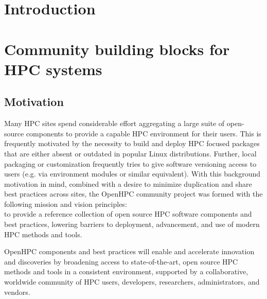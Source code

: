 \documentclass{sig-alternate-05-2015}
\begin{document}
%
%

%
%
\printccsdesc


\section{Introduction}


\section{Community building blocks for HPC systems}

\subsection{Motivation}
Many HPC sites spend considerable effort aggregating a large suite of
open-source components to provide a capable HPC environment for their users.
This is frequently motivated by the necessity to build and deploy HPC focused
packages that are either absent or outdated in popular Linux
distributions. Further, local packaging or customization frequently tries to
give software versioning access to users (e.g. via environment modules or
similar equivalent).  With this background motivation in mind, combined with a
desire to minimize duplication and share best practices across sites, the OpenHPC community
project was formed with the following mission and vision principles: \\

 to 
provide a reference collection of open source HPC software components and
best practices, lowering barriers to deployment, advancement, and use of
modern HPC methods and tools.

 OpenHPC components and best practices will enable and
accelerate innovation and discoveries by broadening access to state-of-the-art,
open source HPC methods and tools in a consistent environment, supported by a
collaborative, worldwide community of HPC users, developers, researchers,
administrators, and vendors. \\

\end{document}
